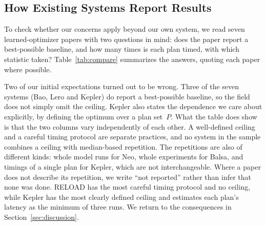 \documentclass[conference]{IEEEtran}
\begin{document}
\subsection{How Existing Systems Report Results}
\label{sec:survey}

To check whether our concerns apply beyond our own system, we read seven
learned-optimizer papers with two questions in mind: does the paper report a
best-possible baseline, and how many times is each plan timed, with which
statistic taken? Table~\ref{tab:compare} summarizes the answers, quoting each
paper where possible.

Two of our initial expectations turned out to be wrong. Three of the seven
systems (Bao, Lero and Kepler) do report a best-possible baseline, so the field
does not simply omit the ceiling. Kepler also states the dependence we care
about explicitly, by defining the optimum over a plan set~$P$. What the table
does show is that the two columns vary independently of each other. A
well-defined ceiling and a careful timing protocol are separate practices, and
no system in the sample combines a ceiling with median-based repetition. The
repetitions are also of different kinds: whole model runs for Neo, whole
experiments for Balsa, and timings of a single plan for Kepler, which are not
interchangeable. Where a paper does not describe its repetition, we write ``not
reported'' rather than infer that none was done. RELOAD
has the most careful timing protocol and no ceiling, while Kepler has the most
clearly defined ceiling and estimates each plan's latency as the minimum of
three runs. We return to the consequences in Section~\ref{sec:discussion}.
\end{document}
